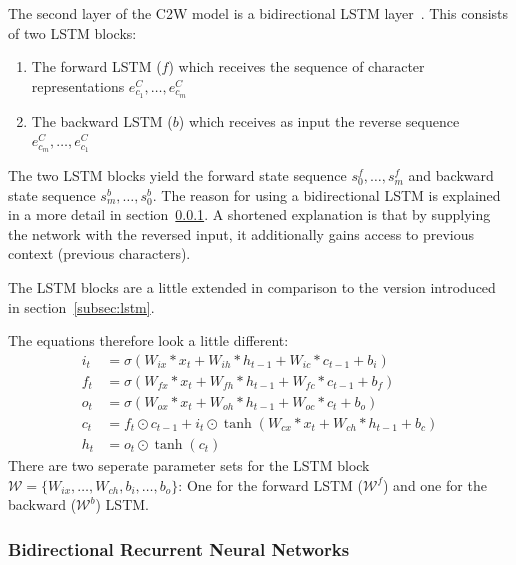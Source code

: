 The second layer of the C2W model is a bidirectional LSTM layer~\cite{DBLP:journals/nn/GravesS05}. This consists of two LSTM blocks:
\begin{enumerate}
  \item The forward LSTM ($f$) which receives the sequence of character representations $e_{c_1}^C, \dots, e_{c_m}^C$
  \item The backward LSTM ($b$) which receives as input the reverse sequence $e_{c_m}^C, \dots, e_{c_1}^C$
\end{enumerate}
The two LSTM blocks yield the forward state sequence $s_{0}^f, \dots, s_{m}^f$ and backward state sequence $s_{m}^b, \dots, s_{0}^b$.
The reason for using a bidirectional LSTM is explained in a more detail in section~\ref{subsec:bidir-rnn}. A shortened explanation is 
that by supplying the network with the reversed input, it additionally gains access to previous context (previous characters).
 
The LSTM blocks are a little extended in comparison to the version introduced in section~\ref{subsec:lstm}.

The equations therefore look a little different:
\begin{equation}
\begin{aligned}  
  i_t &=\sigma(W_{ix} * x_t  + W_{ih} * h_{t-1} + W_{ic} * c_{t-1} + b_i) \\  
  f_t &=\sigma(W_{fx} * x_t  + W_{fh} * h_{t-1} + W_{fc} * c_{t-1} + b_f) \\
  o_t &=\sigma(W_{ox} * x_t  + W_{oh} * h_{t-1} + W_{oc} * c_t + b_o) \\  
  c_t &= f_t \odot c_{t-1} + i_t \odot \tanh(W_{cx} * x_t  + W_{ch} * h_{t-1} + b_c) \\ 
  h_t &= o_t \odot \tanh(c_t) 
\end{aligned}
\end{equation}
There are two seperate parameter sets for the LSTM block $\mathcal{W} = \{W_{ix},\dots,W_{ch},b_i,\dots,b_o\}$:
One for the forward LSTM ($\mathcal{W}^f$) and one for the backward ($\mathcal{W}^b$) LSTM.

\subsubsection{Bidirectional Recurrent Neural Networks}
\label{subsec:bidir-rnn}

